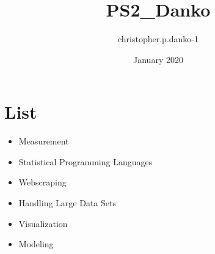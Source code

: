\documentclass{article}
\title{PS2_Danko}
\author{christopher.p.danko-1 }
\date{January 2020}
\begin{document}
\section{List}

\begin{itemize}
    \item Measurement
    \item Statistical Programming Languages
    \item Webscraping
    \item Handling Large Data Sets
    \item Visualization
    \item Modeling
\end{itemize}
\end{document}
